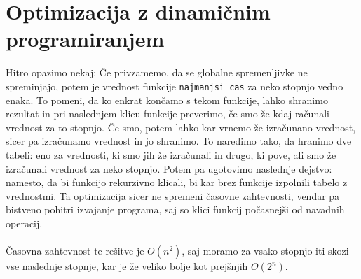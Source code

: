 \section{Optimizacija z dinamičnim programiranjem}\label{sec:optimizacija-z-dinamicnim-programiranjem}
Hitro opazimo nekaj:
Če privzamemo, da se globalne spremenljivke ne spreminjajo, potem je vrednost funkcije \texttt{najmanjsi\_cas} za neko stopnjo vedno enaka.
To pomeni, da ko enkrat končamo s tekom funkcije, lahko shranimo rezultat in pri naslednjem klicu funkcije preverimo, če smo že kdaj računali vrednost za to stopnjo.
Če smo, potem lahko kar vrnemo že izračunano vrednost, sicer pa izračunamo vrednost in jo shranimo.
To naredimo tako, da hranimo dve tabeli: eno za vrednosti, ki smo jih že izračunali in drugo, ki pove, ali smo že izračunali vrednost za neko stopnjo.
Potem pa ugotovimo naslednje dejstvo:
namesto, da bi funkcijo rekurzivno klicali, bi kar brez funkcije izpolnili tabelo z vrednostmi.
Ta optimizacija sicer ne spremeni časovne zahtevnosti, vendar pa bistveno pohitri izvajanje programa, saj so klici funkcij počasnejši od navadnih operacij.
\\
\\
Časovna zahtevnost te rešitve je $O(n^2)$, saj moramo za vsako stopnjo iti skozi vse naslednje stopnje, kar je že veliko bolje kot prejšnjih $O(2^n)$.

